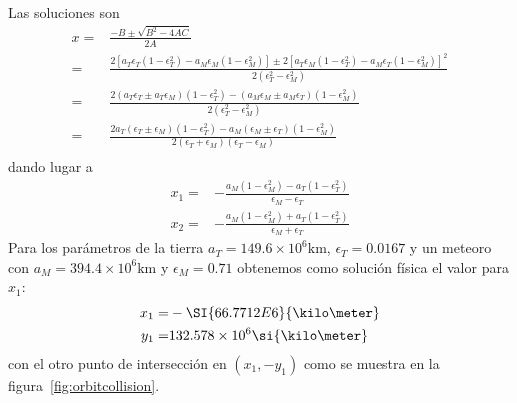 Las soluciones son
\begin{align*}
  x=&\frac{-B\pm\sqrt{B^2-4AC}}{2A}\nonumber\\
  =&\frac{2[a_T\epsilon_T(1-\epsilon_T^2)-a_M\epsilon_M(1-\epsilon_M^2)]\pm
2[a_T\epsilon_M(1-\epsilon_T^2)-a_M\epsilon_T(1-\epsilon_M^2)]^2}{2(\epsilon_T^2-\epsilon_M^2)}\nonumber\\
  =&\frac{2(a_T\epsilon_T\pm a_T\epsilon_M)(1-\epsilon_T^2)-(a_M\epsilon_M\pm a_M\epsilon_T)(1-\epsilon_M^2)}{2(\epsilon_T^2-\epsilon_M^2)}\nonumber\\
  =&\frac{2a_T(\epsilon_T\pm \epsilon_M)(1-\epsilon_T^2)-a_M(\epsilon_M\pm \epsilon_T)(1-\epsilon_M^2)}{2(\epsilon_T+\epsilon_M)(\epsilon_T-\epsilon_M)}\nonumber\\
\end{align*}
dando lugar a
\begin{align}
  \label{eq:xyoc}
  x_1=&-\frac{a_M(1-\epsilon_M^2)-a_T(1-\epsilon_T^2)}{\epsilon_M-\epsilon_T}\nonumber\\
  x_2=&-\frac{a_M(1-\epsilon_M^2)+a_T(1-\epsilon_T^2)}{\epsilon_M+\epsilon_T}
\end{align}
Para los parámetros de la tierra $a_T={149.6\times10^{6}}\si{\kilo\meter}$, $\epsilon_T=0.0167$ y un meteoro con $a_M={394.4\times10^{6}}\si{\kilo\meter}$ y $\epsilon_M=0.71$
obtenemos como solución física el valor para $x_1$:
\begin{align}
  x_1=&-\SI{66.7712E{6}}{\kilo\meter}\nonumber\\
  y_1=&{132.578\times10^{6}}\si{\kilo\meter}\,
\end{align}
con el otro punto de intersección en $(x_1,-y_1)$ como se muestra en la figura~\ref{fig:orbitcollision}.
